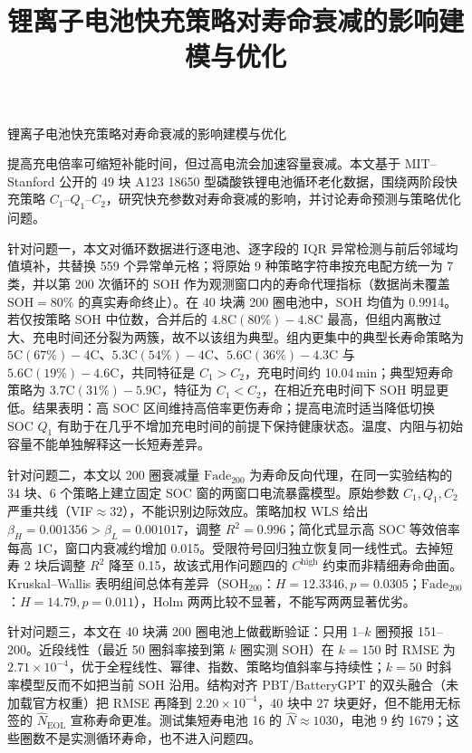 \documentclass[a4paper,12pt,UTF8,zihao=-4]{ctexart}
\title{锂离子电池快充策略对寿命衰减的影响建模与优化}
\author{} %
\date{}
\begin{document}
\thispagestyle{plain}
\begin{center}
{\heiti{} 锂离子电池快充策略对寿命衰减的影响建模与优化}
\end{center}
\vspace{0.8em}


\vspace{0.4em}
\noindent
提高充电倍率可缩短补能时间，但过高电流会加速容量衰减。本文基于 MIT--Stanford 公开的 49 块 A123 18650 型磷酸铁锂电池循环老化数据，围绕两阶段快充策略 \(C_1\)--\(Q_1\)--\(C_2\)，研究快充参数对寿命衰减的影响，并讨论寿命预测与策略优化问题。

针对问题一，本文对循环数据进行逐电池、逐字段的 IQR 异常检测与前后邻域均值填补，共替换 559 个异常单元格；将原始 9 种策略字符串按充电配方统一为 7 类，并以第 200 次循环的 SOH 作为观测窗口内的寿命代理指标（数据尚未覆盖 \(\mathrm{SOH}=80\%\) 的真实寿命终止）。在 40 块满 200 圈电池中，SOH 均值为 0.9914。若仅按策略 SOH 中位数，合并后的 \(4.8\mathrm{C}(80\%)-4.8\mathrm{C}\) 最高，但组内离散过大、充电时间还分裂为两簇，故不以该组为典型。组内更集中的典型长寿命策略为 \(5\mathrm{C}(67\%)-4\mathrm{C}\)、\(5.3\mathrm{C}(54\%)-4\mathrm{C}\)、\(5.6\mathrm{C}(36\%)-4.3\mathrm{C}\) 与 \(5.6\mathrm{C}(19\%)-4.6\mathrm{C}\)，共同特征是 \(C_1>C_2\)，充电时间约 10.04\,min；典型短寿命策略为 \(3.7\mathrm{C}(31\%)-5.9\mathrm{C}\)，特征为 \(C_1<C_2\)，在相近充电时间下 SOH 明显更低。结果表明：高 SOC 区间维持高倍率更伤寿命；提高电流时适当降低切换 SOC \(Q_1\) 有助于在几乎不增加充电时间的前提下保持健康状态。温度、内阻与初始容量不能单独解释这一长短寿差异。

针对问题二，本文以 200 圈衰减量 \(\mathrm{Fade}_{200}\) 为寿命反向代理，在同一实验结构的 34 块、6 个策略上建立固定 SOC 窗的两窗口电流暴露模型。原始参数 \(C_1,Q_1,C_2\) 严重共线（VIF\(\approx 32\)），不能识别边际效应。策略加权 WLS 给出 \(\beta_H=0.001356>\beta_L=0.001017\)，调整 \(R^2=0.996\)；简化式显示高 SOC 等效倍率每高 1C，窗口内衰减约增加 0.015。受限符号回归独立恢复同一线性式。去掉短寿 2 块后调整 \(R^2\) 降至 0.15，故该式用作问题四的 \(C^{\mathrm{high}}\) 约束而非精细寿命曲面。Kruskal--Wallis 表明组间总体有差异（\(\mathrm{SOH}_{200}\)：\(H=12.3346,p=0.0305\)；\(\mathrm{Fade}_{200}\)：\(H=14.79,p=0.011\)），Holm 两两比较不显著，不能写两两显著优劣。

针对问题三，本文在 40 块满 200 圈电池上做截断验证：只用 1--\(k\) 圈预报 151--200。近段线性（最近 50 圈斜率接到第 \(k\) 圈实测 SOH）在 \(k=150\) 时 RMSE 为 \(2.71\times 10^{-4}\)，优于全程线性、幂律、指数、策略均值斜率与持续性；\(k=50\) 时斜率模型反而不如把当前 SOH 沿用。结构对齐 PBT/BatteryGPT 的双头融合（未加载官方权重）把 RMSE 再降到 \(2.20\times 10^{-4}\)，40 块中 27 块更好，但不能用无标签的 \(\hat N_{\mathrm{EOL}}\) 宣称寿命更准。测试集短寿电池 16 的 \(\hat N\approx 1030\)，电池 9 约 1679；这些圈数不是实测循环寿命，也不进入问题四。
\end{document}
